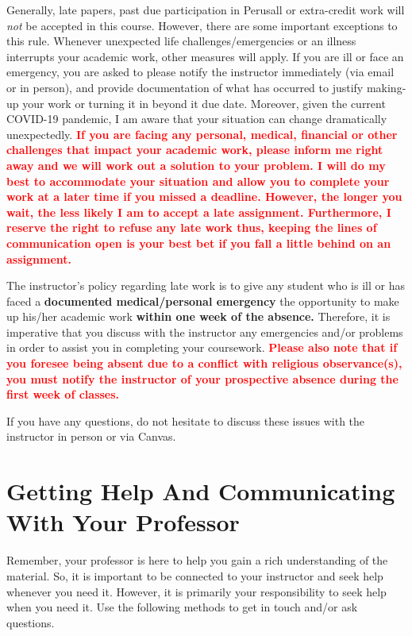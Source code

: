 \documentclass[11pt,]{article}
\begin{document}
Generally, late papers, past due participation in Perusall or
extra-credit work will \emph{not} be accepted in this course. However,
there are some important exceptions to this rule. Whenever unexpected
life challenges/emergencies or an illness interrupts your academic work,
other measures will apply. If you are ill or face an emergency, you are
asked to please notify the instructor immediately (via email or in
person), and provide documentation of what has occurred to justify
making-up your work or turning it in beyond it due date. Moreover, given
the current COVID-19 pandemic, I am aware that your situation can change
dramatically unexpectedly.
\textbf{\textcolor{red}{If you are facing any personal, medical, financial or other challenges that impact your academic work, please inform me right away and we will work out a solution to your problem. I will do my best to accommodate your situation and allow you to complete your work at a later time if you missed a deadline.}
\textcolor{red}{However, the longer you wait, the less likely I am to accept a late assignment. Furthermore, I reserve the right to refuse any late work thus, keeping the lines of communication open is your best bet if you fall a little behind on an assignment.}}

The instructor's policy regarding late work is to give any student who
is ill or has faced a \textbf{documented medical/personal emergency} the
opportunity to make up his/her academic work \textbf{within one week of
the absence.} Therefore, it is imperative that you discuss with the
instructor any emergencies and/or problems in order to assist you in
completing your coursework.
\textcolor{red}{\bf{Please also note that if you foresee being absent due to a conflict with religious observance(s), you must notify the instructor of your prospective absence during the first week of classes.}}

If you have any questions, do not hesitate to discuss these issues with
the instructor in person or via Canvas.

\hypertarget{getting-help-and-communicating-with-your-professor}{%
\section{Getting Help And Communicating With Your
Professor}\label{getting-help-and-communicating-with-your-professor}}

Remember, your professor is here to help you gain a rich understanding
of the material. So, it is important to be connected to your instructor
and seek help whenever you need it. However, it is primarily your
responsibility to seek help when you need it. Use the following methods
to get in touch and/or ask questions.
\end{document}
